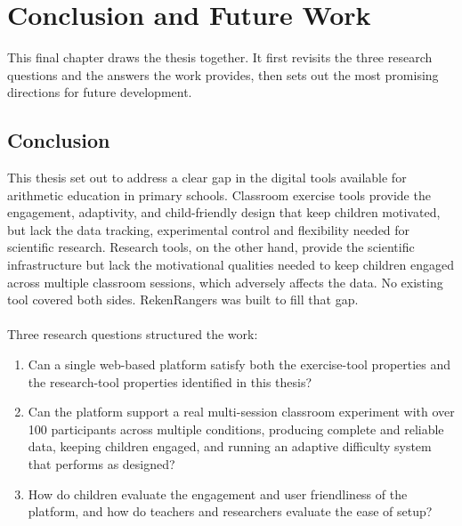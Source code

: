\chapter{Conclusion and Future Work}
\label{chp:conclusions}
This final chapter draws the thesis together. It first revisits the three research questions and the answers the work provides, then sets out the most promising directions for future development.

\section{Conclusion}
This thesis set out to address a clear gap in the digital tools available for arithmetic education in primary schools. Classroom exercise tools provide the engagement, adaptivity, and child-friendly design that keep children motivated, but lack the data tracking, experimental control and flexibility needed for scientific research. Research tools, on the other hand, provide the scientific infrastructure but lack the motivational qualities needed to keep children engaged across multiple classroom sessions, which adversely affects the data. No existing tool covered both sides. RekenRangers was built to fill that gap.
\\ \\
Three research questions structured the work:

\begin{enumerate}
\item[\textbf{RQ1}] Can a single web-based platform satisfy both the exercise-tool properties and the research-tool properties identified in this thesis?
\item[\textbf{RQ2}] Can the platform support a real multi-session classroom experiment with over 100 participants across multiple conditions, producing complete and reliable data, keeping children engaged, and running an adaptive difficulty system that performs as designed?
\item[\textbf{RQ3}] How do children evaluate the engagement and user friendliness of the platform, and how do teachers and researchers evaluate the ease of setup?
\end{enumerate}

